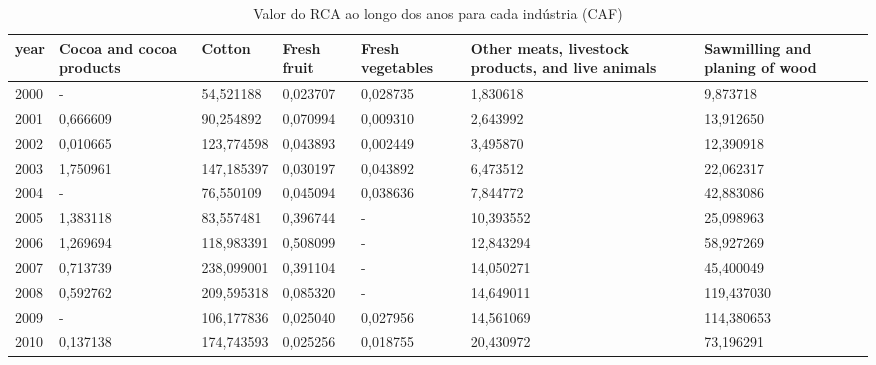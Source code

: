 \begin{table}
\centering
\caption{Valor do RCA ao longo dos anos para cada indústria (CAF)}
\begin{tabular}{p{1cm}p{2cm}p{2cm}p{2cm}p{2cm}p{2cm}p{2cm}}
\toprule
 year &  Cocoa and cocoa products &     Cotton &  Fresh fruit &  Fresh vegetables &  Other meats, livestock products, and live animals &  Sawmilling and planing of wood \\
\midrule
 2000 &                         - &  54,521188 &     0,023707 &          0,028735 &                                           1,830618 &                        9,873718 \\
 2001 &                  0,666609 &  90,254892 &     0,070994 &          0,009310 &                                           2,643992 &                       13,912650 \\
 2002 &                  0,010665 & 123,774598 &     0,043893 &          0,002449 &                                           3,495870 &                       12,390918 \\
 2003 &                  1,750961 & 147,185397 &     0,030197 &          0,043892 &                                           6,473512 &                       22,062317 \\
 2004 &                         - &  76,550109 &     0,045094 &          0,038636 &                                           7,844772 &                       42,883086 \\
 2005 &                  1,383118 &  83,557481 &     0,396744 &                 - &                                          10,393552 &                       25,098963 \\
 2006 &                  1,269694 & 118,983391 &     0,508099 &                 - &                                          12,843294 &                       58,927269 \\
 2007 &                  0,713739 & 238,099001 &     0,391104 &                 - &                                          14,050271 &                       45,400049 \\
 2008 &                  0,592762 & 209,595318 &     0,085320 &                 - &                                          14,649011 &                      119,437030 \\
 2009 &                         - & 106,177836 &     0,025040 &          0,027956 &                                          14,561069 &                      114,380653 \\
 2010 &                  0,137138 & 174,743593 &     0,025256 &          0,018755 &                                          20,430972 &                       73,196291 \\

\end{tabular}
\end{table}
